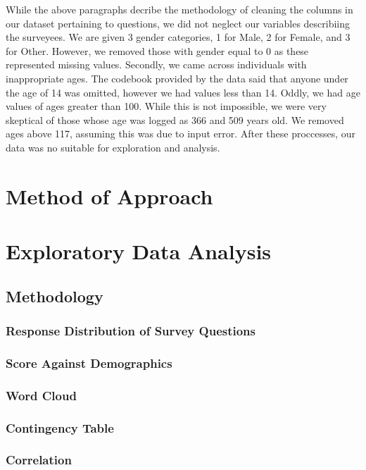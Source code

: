 \documentclass{article}
\begin{document}
While the above paragraphs decribe the methodology of cleaning the columns in our dataset pertaining to questions, we did not neglect our variables describiing the surveyees. We are given 3 gender categories, 1 for Male, 2 for Female, and 3 for Other. However, we removed those with gender equal to 0 as these represented missing values. Secondly, we came across individuals with inappropriate ages. The codebook provided by the data said that anyone under the age of 14 was omitted, however we had values less than 14. Oddly, we had age values of ages greater than 100. While this is not impossible, we were very skeptical of those whose age was logged as 366 and 509 years old. We removed ages above 117, assuming this was due to input error. After these proccesses, our data was no suitable for exploration and analysis. 

\section{Method of Approach}

\newpage
\section{Exploratory Data Analysis}

\subsection{Methodology}

\subsubsection{Response Distribution of Survey Questions}

\subsubsection{Score Against Demographics}

\subsubsection{Word Cloud}

\subsubsection{Contingency Table}

\subsubsection{Correlation}
\end{document}
